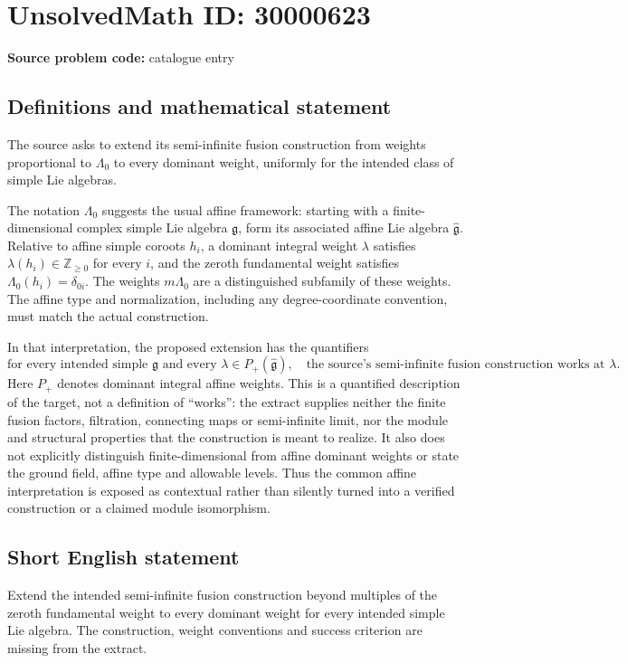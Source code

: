 \documentclass[11pt]{article}
\newcommand{\Z}{\mathbb{Z}}
\begin{document}
\section*{UnsolvedMath ID: 30000623}
\textbf{Source problem code:} catalogue entry
\subsection{Definitions and mathematical statement}
The source asks to extend its semi-infinite fusion construction from weights proportional to $\Lambda_0$ to every dominant weight, uniformly for the intended class of simple Lie algebras.

The notation $\Lambda_0$ suggests the usual affine framework: starting with a finite-dimensional complex simple Lie algebra $\mathfrak g$, form its associated affine Lie algebra $\widehat{\mathfrak g}$. Relative to affine simple coroots $h_i$, a dominant integral weight $\lambda$ satisfies $\lambda(h_i)\in\Z_{\geq0}$ for every $i$, and the zeroth fundamental weight satisfies $\Lambda_0(h_i)=\delta_{0i}$. The weights $m\Lambda_0$ are a distinguished subfamily of these weights. The affine type and normalization, including any degree-coordinate convention, must match the actual construction.

In that interpretation, the proposed extension has the quantifiers
\[
\text{for every intended simple }\mathfrak g
\text{ and every }\lambda\in P_+(\widehat{\mathfrak g}),
\quad\text{the source's semi-infinite fusion construction works at }\lambda.
\]
Here $P_+$ denotes dominant integral affine weights. This is a quantified description of the target, not a definition of ``works'': the extract supplies neither the finite fusion factors, filtration, connecting maps or semi-infinite limit, nor the module and structural properties that the construction is meant to realize. It also does not explicitly distinguish finite-dimensional from affine dominant weights or state the ground field, affine type and allowable levels. Thus the common affine interpretation is exposed as contextual rather than silently turned into a verified construction or a claimed module isomorphism.
\subsection{Short English statement}
Extend the intended semi-infinite fusion construction beyond multiples of the zeroth fundamental weight to every dominant weight for every intended simple Lie algebra. The construction, weight conventions and success criterion are missing from the extract.
\end{document}
